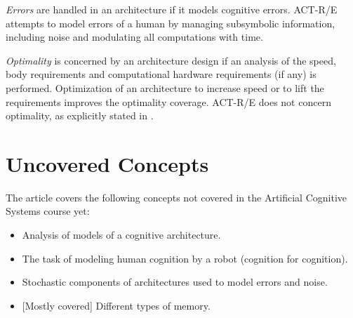 \documentclass[10pt]{article}
\begin{document}
\emph{Errors} are handled in an architecture if it models cognitive errors. ACT-R/E attempts to model errors of a human by managing subsymbolic information, including noise and modulating all computations with time.

\emph{Optimality} is concerned by an architecture design if an analysis of the speed, body requirements and computational hardware requirements (if any) is performed. Optimization of an architecture to increase speed or to lift the requirements improves the optimality coverage. ACT-R/E does not concern optimality, as explicitly stated in \cite{actre}. 

\section{Uncovered Concepts}

The article \cite{actre} covers the following concepts not covered in the Artificial Cognitive Systems course yet:

\begin{itemize}
	\item Analysis of models of a cognitive architecture.
	\item The task of modeling human cognition by a robot (cognition for cognition).
	\item Stochastic components of architectures used to model errors and noise.
	\item{[Mostly covered] Different types of memory.}
\end{itemize}

\begin{thebibliography}{2}
\end{thebibliography}
\end{document}
